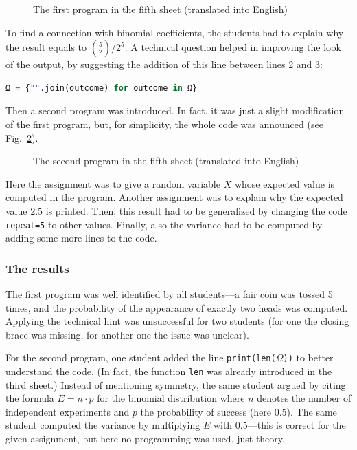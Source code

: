 \documentclass[]{interact}
\theoremstyle{plain}%
\theoremstyle{definition}
\theoremstyle{remark}
\begin{document}
\begin{figure}

\caption{The first program in the fifth sheet (translated into English)}
\label{5a.py}
\end{figure}

To find a connection with binomial coefficients, the students had to explain why the result
equals to $\binom{5}{2}/2^5$. A technical question helped in improving the look of the output,
by suggesting the addition of this line between lines 2 and 3:
\begin{lstlisting}[language=Python,numbers=none]
Ω = {"".join(outcome) for outcome in Ω}
\end{lstlisting}

Then a second program was introduced. In fact, it was just a slight modification of the first program,
but, for simplicity, the whole code was announced (see Fig.~\ref{5b.py}).
\begin{figure}

\caption{The second program in the fifth sheet (translated into English)}
\label{5b.py}
\end{figure}
Here the assignment was to give a random variable $X$ whose expected value is computed in the program.
Another assignment was to explain why the expected value $2.5$ is printed. Then, this result
had to be generalized by changing the code \texttt{repeat=5} to other values. Finally,
also the variance had to be computed by adding some more lines to the code.

\subsubsection*{The results}

The first program was well identified by all students---a fair coin was tossed 5 times,
and the probability of the appearance of exactly two heads was computed.
Applying the technical hint was unsuccessful for two students (for one the closing brace was missing,
for another one the issue was unclear).

For the second program, one student added the line \texttt{print(len($\Omega$))} to better understand the
code. (In fact, the function \texttt{len} was already introduced in the third sheet.) Instead
of mentioning symmetry, the same student argued by citing the formula $E=n\cdot p$ for the
binomial distribution where $n$ denotes the number of independent experiments and $p$ the probability
of success (here $0.5$). The same student computed the variance by multiplying $E$ with $0.5$---this
is correct for the given assignment, but here no programming was used, just theory.
\end{document}
